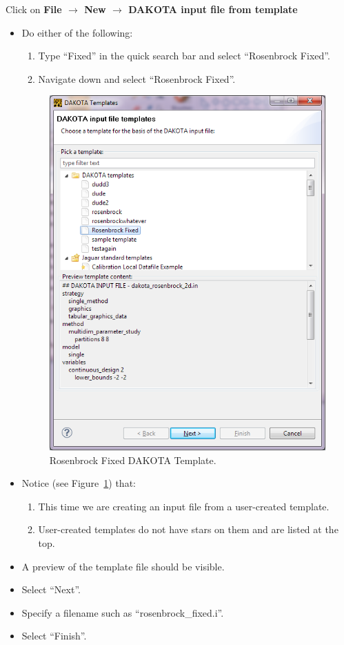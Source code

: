 Click on {\bf File $\rightarrow$ New $\rightarrow$ DAKOTA input file
  from template}
\begin{itemize}
\item Do either of the following:
\begin{enumerate}
\item Type ``Fixed'' in the quick search bar and select ``Rosenbrock Fixed''.
\item Navigate down and select ``Rosenbrock Fixed''.
\end{enumerate}
\begin{figure}[htbp]
  \centering
  \includegraphics[scale=0.6]{images/10Template_Rosenbrock}
  \caption{Rosenbrock Fixed DAKOTA Template.}
  \label{fig:input:10Template_Rosenbrock}
\end{figure}

\item Notice (see Figure~\ref{fig:input:10Template_Rosenbrock}) that:
\begin{enumerate}
\item This time we are creating an input file from a user-created template.
\item User-created templates do not have stars on them and are listed
  at the top.
\end{enumerate} 
\item A preview of the template file should be visible.
\item Select ``Next''.
\item Specify a filename such as ``rosenbrock\_fixed.i''. 
\item Select ``Finish''.
\end{itemize}


